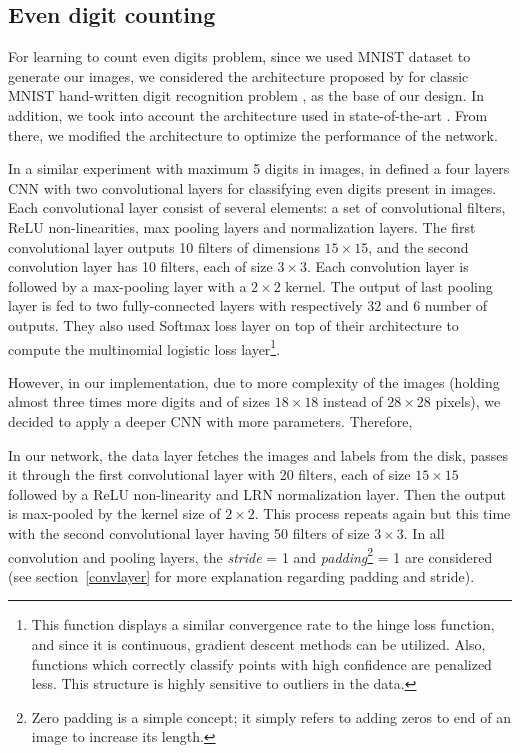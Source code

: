 \subsection{Even digit counting}
\label{subsubsec:digitarch}

For learning to count even digits problem, since we used MNIST dataset to generate our images, we considered the architecture proposed by \citeauthor{lecun1995comparison} for classic MNIST hand-written digit recognition problem \cite{lecun1995comparison}, as the base of our design. In addition, we took into account the architecture used in state-of-the-art \cite{segui2015learning}. From there, we modified the architecture to optimize the performance of the network. 
 

\noindent In a similar experiment with maximum 5 digits in images, \citeauthor{segui2015learning} in \cite{segui2015learning} defined a four layers CNN with two convolutional layers for classifying even digits present in images. Each convolutional layer consist of several elements: a set of convolutional filters, ReLU non-linearities, max pooling layers and normalization layers. The first convolutional layer outputs 10 filters of dimensions $15\times15$, and the second convolution layer has 10 filters, each of size $3\times3$. Each convolution layer is followed by a max-pooling layer with a $2\times2$ kernel. The output of last pooling layer is fed to two fully-connected layers with respectively 32 and 6 number of outputs. They also used Softmax loss layer on top of their architecture to compute the multinomial logistic loss layer\footnote{This function displays a similar convergence rate to the hinge loss function, and since it is continuous, gradient descent methods can be utilized. Also, functions which correctly classify points with high confidence are penalized less. This structure is highly sensitive to outliers in the data.}. 


\noindent However, in our implementation, due to more complexity of the images (holding almost three times more digits and of sizes $18\times18$ instead of $28\times28$ pixels), we decided to apply a deeper CNN with more parameters. Therefore, 

In our network, the data layer fetches the images and labels from the disk, passes it through the first convolutional layer with 20 filters, each of size $15\times15$ followed by a ReLU non-linearity and LRN normalization layer. Then the output is max-pooled by the  kernel size of $2\times2$. This process repeats again but this time with the second convolutional layer having 50 filters of size $3\times3$. In all convolution and pooling layers, the \textit{stride} = 1 and \textit{padding}\footnote{Zero padding is a simple concept; it simply refers to adding zeros to end of an image to increase its length.} = 1 are considered (see section~\ref{convlayer} for more explanation regarding padding and stride). 

